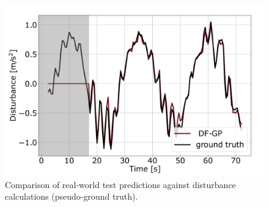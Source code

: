 \begin{figure}[t]
	\centering	\includegraphics[width=0.7\linewidth]{figures/pred_real.pdf}
	\caption{Comparison of real-world test predictions against disturbance calculations (pseudo-ground truth).} %
	\label{fig:pred_dist_real}
\end{figure}







